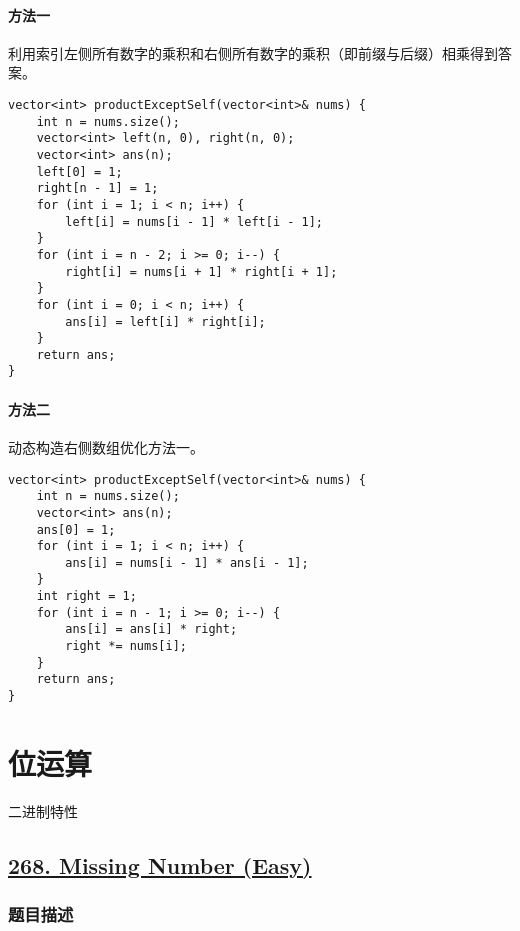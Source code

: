 \documentclass[lang=cn,10pt]{elegantbook}
\begin{document}
\subsubsection*{方法一}

利用索引左侧所有数字的乘积和右侧所有数字的乘积（即前缀与后缀）相乘得到答案。

\begin{lstlisting}
vector<int> productExceptSelf(vector<int>& nums) {
	int n = nums.size();
	vector<int> left(n, 0), right(n, 0);
	vector<int> ans(n);
	left[0] = 1;
	right[n - 1] = 1;
	for (int i = 1; i < n; i++) {
		left[i] = nums[i - 1] * left[i - 1];
	}
	for (int i = n - 2; i >= 0; i--) {
		right[i] = nums[i + 1] * right[i + 1];
	}
	for (int i = 0; i < n; i++) {
		ans[i] = left[i] * right[i];
	}
	return ans;
}
\end{lstlisting}

\subsubsection*{方法二}

动态构造右侧数组优化方法一。

\begin{lstlisting}
vector<int> productExceptSelf(vector<int>& nums) {
	int n = nums.size();
	vector<int> ans(n);
	ans[0] = 1;
	for (int i = 1; i < n; i++) {
		ans[i] = nums[i - 1] * ans[i - 1];
	}
	int right = 1;
	for (int i = n - 1; i >= 0; i--) {
		ans[i] = ans[i] * right;
		right *= nums[i];
	}
	return ans;
}
\end{lstlisting}

\chapter{位运算}

\begin{introduction}[前情提要]
	\item 二进制特性
\end{introduction}

{\color{red}\section{\href{https://leetcode.cn/problems/missing-number/}{268. Missing Number (Easy)}}} \label{ch10.268}

\subsection*{题目描述}
\end{document}
